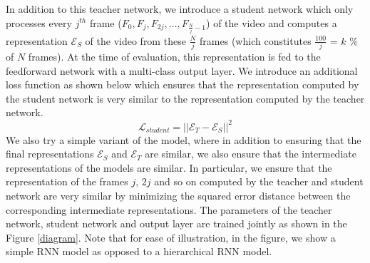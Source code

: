\documentclass[10pt,twocolumn,letterpaper]{article}
\begin{document}
In addition to this teacher network, we introduce a student network which only processes every $j^{th}$  frame ($F_0, F_j, F_{2j}, \dots, F_{\frac{N}{j}-1} $) of the video and computes a representation $\mathcal{E}_S$ of the video from these $\frac{N}{j}$ frames (which constitutes $\frac{100}{j}$ = $k$ $\%$ of $N$ frames). At the time of evaluation, this representation is fed to the feedforward network with a multi-class output layer. We introduce an additional loss function as shown below which ensures that the representation computed by the student network is very similar to the representation computed by the teacher network.  
\begin{equation*}
 \mathcal{L}_{student} = || \mathcal{E}_{T} - \mathcal{E}_{S} ||^{2}
\end{equation*}
We also try a simple variant of the model, where in addition to ensuring that the final representations $\mathcal{E}_S$ and $\mathcal{E}_T$  are similar, we also ensure that the intermediate representations of the models are similar. In particular, we ensure that the representation of the frames $j$, $2j$ and so on computed by the teacher and  student network are very similar by minimizing the squared error distance between the corresponding intermediate representations. The parameters of the teacher network, student network and output layer are trained jointly as shown in the Figure \ref{diagram}. Note that for ease of illustration, in the figure, we show a simple RNN model as opposed to a hierarchical RNN model. 
\end{document}
